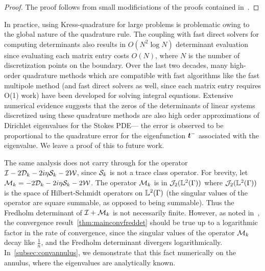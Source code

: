 \begin{proof}
The proof follows from small modificiations of the proofs contained in~\cite{zhao2015robust}. 
\end{proof}

In practice, using Kress-quadrature for large problems is problematic owing to the global
nature of the quadrature rule. 
The coupling with fast direct solvers for computing determinants also results in $O(N^2 \log{N})$ 
determinant evaluation since evaluating each matrix entry costs $O(N)$, where 
$N$ is the number of discretization points on the boundary.
Over the last two decades, many high-order quadrature methods which are compatible with
fast algorithms like the fast multipole method (and fast direct solvers as well, 
since each matrix entry requires O(1) work) have been developed for solving
integral equations.
Extensive numerical evidence suggests that the zeros of the 
determinants of linear systems discretized using 
these quadrature methods are also high order approximations of Dirichlet eigenvalues
for the Stokes PDE--- the error is observed to be proportional to the quadrature error
for the eigenfunction ${\boldsymbol t}^{-}$ associated with the eigenvalue.
We leave a proof of this to future work.


\begin{remark}
The same analysis does not carry through for the operator
$\mathcal I - 2 {\mathcal D}_{k} - 2i\eta {\mathcal S}_{k} - 2{\mathcal W}$, 
since ${\mathcal S}_{k}$ is not a trace class operator.
For brevity, let ${\mathcal M}_{k} = -2{\mathcal D}_{k} - 2i\eta {\mathcal S}_{k} - 2{\mathcal W}$.
The operator ${\mathcal M}_{k}$ is 
in ${\mathcal J}_{2}({\mathbb L}^{2}(\Gamma))$ where
${\mathcal J}_{2}({\mathbb L}^{2}(\Gamma))$ is the space of Hilbert-Schmidt operators
on ${\mathbb L}^{2}(\Gamma)$ (the singular values of the operator are square
summable, as opposed to being summable).
Thus the Fredholm determinant of $\mathcal I + {\mathcal M}_{k}$
is not necessarily finite. 
However, as noted in~\cite{zhao2015robust}, the convergence
result~\cref{thm:mainconvfreddet}
should be true up to a logarithmic factor in the rate
of convergence, since the singular values of the operator
${\mathcal M}_{k}$ decay like $\frac{1}{n}$, and the
Fredholm determinant divergers logarithmically. 
In~\cref{subsec:convannulus}, we demonstrate that this fact
numerically on the annulus, where the eigenvalues are analytically known. 
\end{remark}
